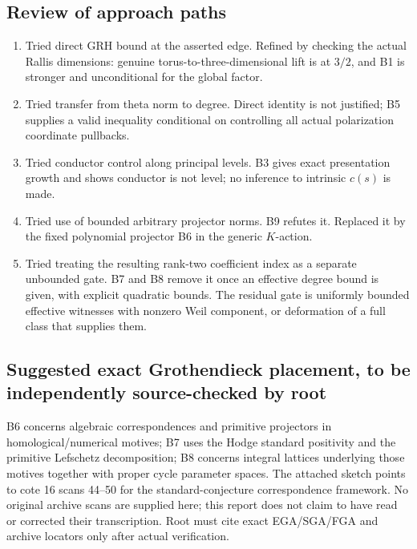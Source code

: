 \documentclass[11pt,a4paper]{article}
\providecommand{\tightlist}{\setlength{\itemsep}{0pt}\setlength{\parskip}{0pt}}
\theoremstyle{definition}
\begin{document}
\subsection{Review of approach paths}\label{review-of-approach-paths}

\begin{enumerate}
\def\labelenumi{\arabic{enumi}.}
\tightlist
\item
  Tried direct GRH bound at the asserted edge. Refined by checking the
  actual Rallis dimensions: genuine torus-to-three-dimensional lift is
  at \(3/2\), and B1 is stronger and unconditional for the global
  factor.
\item
  Tried transfer from theta norm to degree. Direct identity is not
  justified; B5 supplies a valid inequality conditional on controlling
  all actual polarization coordinate pullbacks.
\item
  Tried conductor control along principal levels. B3 gives exact
  presentation growth and shows conductor is not level; no inference to
  intrinsic \(c(s)\) is made.
\item
  Tried use of bounded arbitrary projector norms. B9 refutes it.
  Replaced it by the fixed polynomial projector B6 in the generic
  \(K\)-action.
\item
  Tried treating the resulting rank-two coefficient index as a separate
  unbounded gate. B7 and B8 remove it once an effective degree bound is
  given, with explicit quadratic bounds. The residual gate is uniformly
  bounded effective witnesses with nonzero Weil component, or
  deformation of a full class that supplies them.
\end{enumerate}

\subsection{Suggested exact Grothendieck placement, to be independently
source-checked by
root}\label{suggested-exact-grothendieck-placement-to-be-independently-source-checked-by-root}

B6 concerns algebraic correspondences and primitive projectors in
homological/numerical motives; B7 uses the Hodge standard positivity and
the primitive Lefschetz decomposition; B8 concerns integral lattices
underlying those motives together with proper cycle parameter spaces.
The attached sketch points to cote 16 scans 44--50 for the
standard-conjecture correspondence framework. No original archive scans
are supplied here; this report does not claim to have read or corrected
their transcription. Root must cite exact EGA/SGA/FGA and archive
locators only after actual verification.
\end{document}
